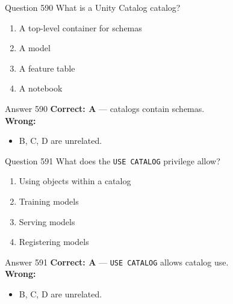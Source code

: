 \documentclass[aspectratio=169,11pt]{beamer}
\begin{document}
	\begin{frame}{Question 590}
		What is a Unity Catalog catalog?
		\begin{enumerate}[label=\Alph*.]
			\item A top-level container for schemas
			\item A model
			\item A feature table
			\item A notebook
		\end{enumerate}
	\end{frame}
	\begin{frame}{Answer 590}
		\textbf{Correct: A} --- catalogs contain schemas.\\
		\vspace{0.5em}
		\textbf{Wrong:}
		\begin{itemize}
			\item B, C, D are unrelated.
		\end{itemize}
	\end{frame}
	
	\begin{frame}{Question 591}
		What does the \texttt{USE CATALOG} privilege allow?
		\begin{enumerate}[label=\Alph*.]
			\item Using objects within a catalog
			\item Training models
			\item Serving models
			\item Registering models
		\end{enumerate}
	\end{frame}
	\begin{frame}{Answer 591}
		\textbf{Correct: A} --- \texttt{USE CATALOG} allows catalog use.\\
		\vspace{0.5em}
		\textbf{Wrong:}
		\begin{itemize}
			\item B, C, D are unrelated.
		\end{itemize}
	\end{frame}
	
\end{document}
